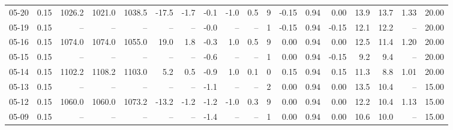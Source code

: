 \begin{threeparttable}
{\begin{tabular}{lrrrrrrrrrrrrrrrrr}
  05-20 &     0.15 & 1026.2 & 1021.0 & 1038.5 &      -17.5 &           -1.7 &                      -0.1 &                     -1.0 &                 0.5 &              9 &      -0.15 &      0.94 &           0.00 &             13.9 &                13.7 &            1.33 &                  20.00 \\
  05-19 &     0.15 &     -- &     -- &     -- &         -- &             -- &                      -0.0 &                       -- &                  -- &              1 &      -0.15 &      0.94 &          -0.15 &             12.1 &                12.2 &              -- &                  20.00 \\
  05-16 &     0.15 & 1074.0 & 1074.0 & 1055.0 &       19.0 &            1.8 &                      -0.3 &                      1.0 &                 0.5 &              9 &       0.00 &      0.94 &           0.00 &             12.5 &                11.4 &            1.20 &                  20.00 \\
  05-15 &     0.15 &     -- &     -- &     -- &         -- &             -- &                      -0.6 &                       -- &                  -- &              1 &       0.00 &      0.94 &          -0.15 &              9.2 &                 9.4 &              -- &                  20.00 \\
  05-14 &     0.15 & 1102.2 & 1108.2 & 1103.0 &        5.2 &            0.5 &                      -0.9 &                      1.0 &                 0.1 &              0 &       0.15 &      0.94 &           0.15 &             11.3 &                 8.8 &            1.01 &                  20.00 \\
  05-13 &     0.15 &     -- &     -- &     -- &         -- &             -- &                      -1.1 &                       -- &                  -- &              2 &       0.00 &      0.94 &           0.00 &             13.5 &                10.4 &              -- &                  15.00 \\
  05-12 &     0.15 & 1060.0 & 1060.0 & 1073.2 &      -13.2 &           -1.2 &                      -1.2 &                     -1.0 &                 0.3 &              9 &       0.00 &      0.94 &           0.00 &             12.2 &                10.4 &            1.13 &                  15.00 \\
  05-09 &     0.15 &     -- &     -- &     -- &         -- &             -- &                      -1.4 &                       -- &                  -- &              1 &       0.00 &      0.94 &           0.00 &             10.6 &                10.0 &              -- &                  15.00 \\

\end{tabular}}
\end{threeparttable}
